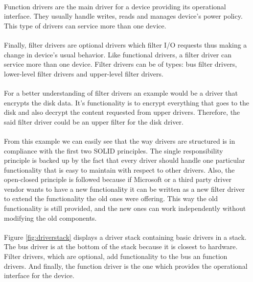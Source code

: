 	   	\paragraph{}
	   	Function drivers are the main driver for a device providing its operational interface. They usually handle writes, reads and manages device's power policy. This type of drivers can service more than one device\cite{MSDNWDMDrivers}.
	   
	   	\paragraph{}
	   	Finally, filter drivers are optional drivers which filter I/O requests thus making a change in device's usual behavior. Like functional drivers, a filter driver can service more than one device. Filter drivers can be of types: bus filter drivers, lower-level filter drivers and upper-level filter drivers\cite{MSDNWDMDrivers}.
	   
	   	\paragraph{}
	   	For a better understanding of filter drivers an example would be a driver that encrypts the disk data. It's functionality is to encrypt everything that goes to the disk and also decrypt the content requested from upper drivers. Therefore, the said filter driver could be an upper filter for the disk driver.
	   
	   	\paragraph{}
	   	From this example we can easily see that the way drivers are structured is in compliance with the first two SOLID principles. The single responsibility principle is backed up by the fact that every driver should handle one particular functionality that is easy to maintain with respect to other drivers. Also, the open-closed principle is followed because if Microsoft or a third party driver vendor wants to have a new functionality it can be written as a new filter driver to extend the functionality the old ones were offering. This way the old functionality is still provided, and the new ones can work independently without modifying the old components.
	   
	   	\paragraph{}
	   	Figure \ref{fig:driverstack} displays a driver stack containing basic drivers in a stack. The bus driver is at the bottom of the stack because it is closest to hardware. Filter drivers, which are optional, add functionality to the bus an function drivers. And finally, the function driver is the one which provides the operational interface for the device.
	    
